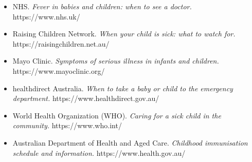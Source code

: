 \begin{itemize}
    \item NHS. \textit{Fever in babies and children: when to see a doctor.} https://www.nhs.uk/
    \item Raising Children Network. \textit{When your child is sick: what to watch for.} https://raisingchildren.net.au/
    \item Mayo Clinic. \textit{Symptoms of serious illness in infants and children.} https://www.mayoclinic.org/
    \item healthdirect Australia. \textit{When to take a baby or child to the emergency department.} https://www.healthdirect.gov.au/
    \item World Health Organization (WHO). \textit{Caring for a sick child in the community.} https://www.who.int/
    \item Australian Department of Health and Aged Care. \textit{Childhood immunisation schedule and information.} https://www.health.gov.au/
\end{itemize}
\clearpage
